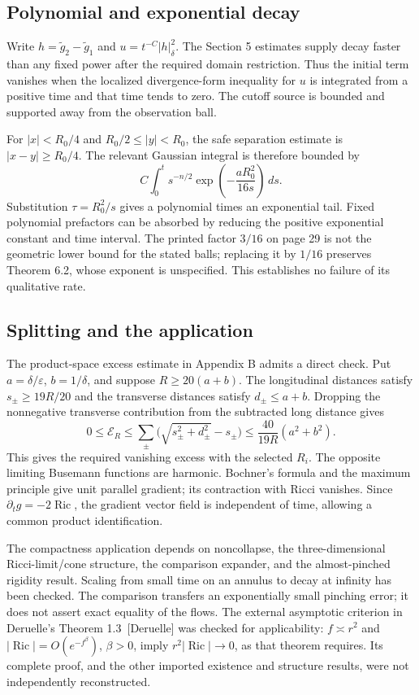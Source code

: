 \documentclass[10pt]{article}
\begin{document}
\subsection*{Polynomial and exponential decay}
Write \(h=\widetilde g_2-\widetilde g_1\) and \(u=t^{-C}|h|_\delta^2\). The Section 5 estimates supply decay faster than any fixed power after the required domain restriction. Thus the initial term vanishes when the localized divergence-form inequality for \(u\) is integrated from a positive time and that time tends to zero. The cutoff source is bounded and supported away from the observation ball.\par
For \(|x|<R_0/4\) and \(R_0/2\leq |y|<R_0\), the safe separation estimate is \(|x-y|\geq R_0/4\). The relevant Gaussian integral is therefore bounded by \[C\int_0^t s^{-n/2}\exp\!\left(-\frac{aR_0^2}{16s}\right)\,ds .\] Substitution \(\tau=R_0^2/s\) gives a polynomial times an exponential tail. Fixed polynomial prefactors can be absorbed by reducing the positive exponential constant and time interval. The printed factor \(3/16\) on page 29 is not the geometric lower bound for the stated balls; replacing it by \(1/16\) preserves Theorem 6.2, whose exponent is unspecified. This establishes no failure of its qualitative rate.\par
\subsection*{Splitting and the application}
The product-space excess estimate in Appendix B admits a direct check. Put \(a=\delta/\varepsilon\), \(b=1/\delta\), and suppose \(R\geq20(a+b)\). The longitudinal distances satisfy \(s_\pm\geq19R/20\) and the transverse distances satisfy \(d_\pm\leq a+b\). Dropping the nonnegative transverse contribution from the subtracted long distance gives \[0\leq\mathcal E_R
 \leq\sum_\pm\bigl(\sqrt{s_\pm^2+d_\pm^2}-s_\pm\bigr)
 \leq\frac{40}{19R}(a^2+b^2).\] This gives the required vanishing excess with the selected \(R_i\). The opposite limiting Busemann functions are harmonic. Bochner’s formula and the maximum principle give unit parallel gradient; its contraction with Ricci vanishes. Since \(\partial_tg=-2\operatorname{Ric}\), the gradient vector field is independent of time, allowing a common product identification.\par
The compactness application depends on noncollapse, the three-dimensional Ricci-limit/cone structure, the comparison expander, and the almost-pinched rigidity result. Scaling from small time on an annulus to decay at infinity has been checked. The comparison transfers an exponentially small pinching error; it does not assert exact equality of the flows. The external asymptotic criterion in Deruelle’s Theorem 1.3 [Deruelle] was checked for applicability: \(f\asymp r^2\) and \(|\operatorname{Ric}|=O(e^{-f^\beta})\), \(\beta>0\), imply \(r^2|\operatorname{Ric}|\to0\), as that theorem requires. Its complete proof, and the other imported existence and structure results, were not independently reconstructed.\par
\end{document}
